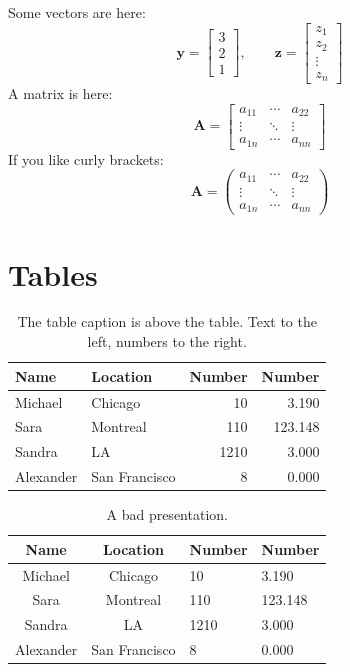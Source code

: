\documentclass[letterpaper, 11pt]{article}
\renewcommand{\vec}[1]{\bm{#1}}
\newcommand{\mat}[1]{\bm{#1}}
\begin{document}
Some vectors are here:
\[
	\vec{y} = \begin{bmatrix} 3 \\ 2 \\ 1 \end{bmatrix}, \qquad
	\vec{z} = \begin{bmatrix} z_1 \\ z_2 \\ \vdots \\ z_n \end{bmatrix}
\]
A matrix is here:
\[
	\mat{A} = \begin{bmatrix} a_{11} & \cdots & a_{22}  \\
							  \vdots & \ddots & \vdots  \\
							  a_{1n} & \cdots & a_{nn}  \end{bmatrix}
\]
If you like curly brackets:
\[
	\mat{A} = \begin{pmatrix} a_{11} & \cdots & a_{22}  \\
							  \vdots & \ddots & \vdots  \\
							  a_{1n} & \cdots & a_{nn}  \end{pmatrix}
\]




\section{Tables}


\begin{table} \centering
\caption{The table caption is above the table. Text to the left, numbers to the right. }
\label{tbl:example}
\begin{tabular}{l l r r}
\toprule
Name		& Location		&  Number	& Number \\
\midrule
Michael		& Chicago			&      10   &   3.190  \\
Sara		& Montreal			&     110   & 123.148  \\
Sandra		& LA				&    1210   &   3.000  \\
Alexander	& San Francisco		&       8   &   0.000  \\
\bottomrule
\end{tabular}
\end{table}

\begin{table} \centering
\caption{A bad presentation.}
\label{tbl:bad_example}
\begin{tabular}{c c l l}
\toprule
Name		& Location		&  Number	& Number \\
\midrule
Michael		& Chicago			&      10   &   3.190  \\
Sara		& Montreal			&     110   & 123.148  \\
Sandra		& LA				&    1210   &   3.000  \\
Alexander	& San Francisco		&       8   &   0.000  \\
\bottomrule
\end{tabular}
\end{table}
\end{document}
